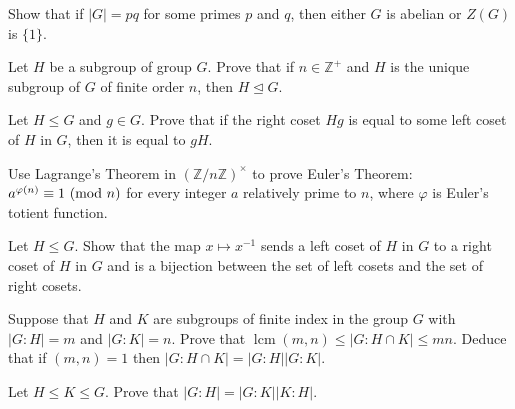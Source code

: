 \begin{exercise}
    Show that if $|G|=pq$ for some primes $p$ and $q$, then either $G$ is abelian or $Z(G)$ is $\{1\}$.
\end{exercise}

\begin{exercise}
    Let $H$ be a subgroup of group $G$. Prove that if $n\in\mathbb{Z}^+$ and $H$ is the unique subgroup of $G$ of finite order $n$, then $H\unlhd G$.
\end{exercise}

\begin{exercise}
    Let $H\leq G$ and $g\in G$. Prove that if the right coset $Hg$ is equal to some left coset of $H$ in $G$, then it is equal to $gH$.
\end{exercise}

\begin{exercise}
    Use Lagrange's Theorem in $(\mathbb{Z}/n\mathbb{Z})^\times$ to prove Euler's Theorem: $a^{\varphi(n)}\equiv 1\ (\mathrm{mod}\ n)$ for every integer $a$ relatively prime to $n$, where $\varphi$ is Euler's totient function.
\end{exercise}

\begin{exercise}
    Let $H\leq G$. Show that the map $x\mapsto x^{-1}$ sends a left coset of $H$ in $G$ to a right coset of $H$ in $G$ and is a bijection between the set of left cosets and the set of right cosets.
\end{exercise}

\begin{exercise}
    Suppose that $H$ and $K$ are subgroups of finite index in the group $G$ with $|G:H|=m$ and $|G:K|=n$. Prove that $\operatorname{lcm}(m,n)\leq|G:H\cap K|\leq mn$. Deduce that if $(m,n)=1$ then $|G:H\cap K|=|G:H||G:K|$.
\end{exercise}

\begin{exercise}
    Let $H\leq K\leq G$. Prove that $|G:H|=|G:K||K:H|$.
\end{exercise}

